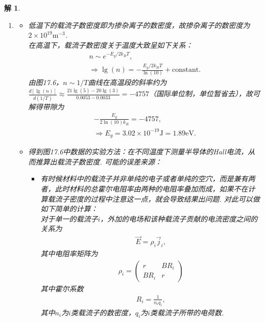 \documentclass[UTF8,10pt,a4paper]{article}
\theoremstyle{Problem}
\theoremstyle{Solution}
\newtheorem*{sol}{解}
\begin{document}
\begin{sol}
\begin{enumerate}
        \item[(c)]
        \begin{itemize}
            \item[$\triangleright$] 低温下的载流子数密度即为掺杂离子的数密度，故掺杂离子的数密度为$2\times 10^{19}\text{m}^{-3}$.\\
        在高温下，载流子数密度关于温度大致呈如下关系：
        \begin{gather}
            n\sim e^{-E_g/2k_BT},\\
        \Longrightarrow\lg(n)=-\frac{E_g/2k_BT}{\ln(10)}+\text{constant}.
        \end{gather}
        由图17.6，$n\sim 1/T$曲线在高温段的斜率约为$\frac{d[\lg(n)]}{d(1/T)}\approx\frac{21\lg(5)-20\lg(3)}{0.0053-0.0033}=-4757$（国际单位制，单位暂省去），故可解得带隙为
        \begin{gather}
            -\frac{E_g}{2\ln(10)k_B}=-4757,\\
            \Longrightarrow E_g=3.02\times 10^{-19}\text{J}=1.89\text{eV}.
        \end{gather}
            \item[$\triangleright$] 得到图17.6中数据的实验方法：在不同温度下测量半导体的Hall电流，从而推算出载流子数密度. 可能的误差来源：
            \begin{itemize}
                \item 有时候材料中的载流子并非单纯的电子或者单纯的空穴，而是兼有两者，此时材料的总霍尔电阻率由两种的电阻率叠加而成，如果不在计算载流子密度的过程中注意这一点，就会导致结果出问题. 对此可以做如下简单的计算：\\
                对于单一的载流子$i$，外加的电场和该种载流子贡献的电流密度之间的关系为
                \begin{align}
                    \vec{E}=\rho_i\vec{j}_i,
                \end{align}
                其中电阻率矩阵为
                \begin{align}
                    \rho_i=\left(\begin{matrix}
                        r & BR_i\\
                        BR_i & r
                    \end{matrix}\right)
                \end{align}
                其中霍尔系数
                \begin{align}
                    R_i=\frac{1}{n_iq_i},
                \end{align}
                其中$n_i$为$i$类载流子的数密度，$q_i$为$i$类载流子所带的电荷数.

\end{itemize}
\end{itemize}
\end{enumerate}
\end{sol}
\end{document}
